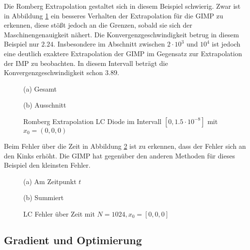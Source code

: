 Die Romberg Extrapolation gestaltet sich in diesem Beispiel schwierig. Zwar ist in Abbildung \ref{fig:lcRomberg} ein besseres Verhalten der Extrapolation für die GIMP zu erkennen, diese stößt jedoch an die Grenzen, sobald sie sich der Maschinengenauigkeit nähert.  Die Konvergenzgeschwindigkeit betrug in diesem Beispiel nur $2.24$. Insbesondere im Abschnitt zwischen $2\cdot 10^{3}$ und $10^4$ ist jedoch eine deutlich exaktere Extrapolation der GIMP im Gegensatz zur Extrapolation der IMP zu beobachten. In diesem Intervall beträgt die Konvergenzgeschwindigkeit schon $3.89$. 
\begin{figure}[H]
\footnotesize 
\centering
\begin{minipage}[b]{0.49\linewidth}

\caption*{(a) Gesamt}
\end{minipage}
\begin{minipage}[b]{0.49\linewidth}

\caption*{(b) Ausschnitt}
\end{minipage}
\caption{Romberg Extrapolation LC Diode im Intervall $[0,1.5\cdot 10^{-8}]$ mit $x_0=(0,0,0)$}
\label{fig:lcRomberg}
\end{figure}



Beim Fehler über die Zeit in Abbildung \ref{fig:lcErrorOverTime} ist zu erkennen, dass der Fehler sich an den Kinks erhöht. Die GIMP hat gegenüber den anderen Methoden für dieses Beispiel den kleinsten Fehler. 
\begin{figure}[H]
\footnotesize 
\centering
\begin{minipage}[b]{0.49\linewidth}

\caption*{(a) Am Zeitpunkt $t$}
\end{minipage}
\begin{minipage}[b]{0.49\linewidth}

\caption*{(b) Summiert}
\end{minipage}
\caption{LC Fehler über Zeit mit $N =1024 ,x_0 = [0,0,0]$}
\label{fig:lcErrorOverTime}
\end{figure}
\subsection{Gradient und Optimierung}


